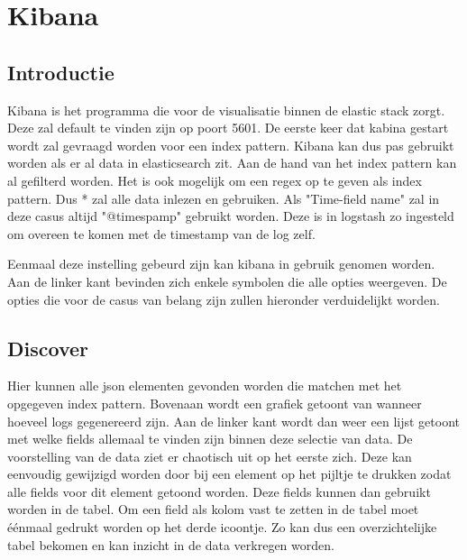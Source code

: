 
\chapter{Kibana}
\label{ch:kibana}

\section{Introductie}
\label{sec:introductie}
Kibana is het programma die voor de visualisatie binnen de elastic stack zorgt. Deze zal default te vinden zijn op poort 5601. 
De eerste keer dat kabina gestart wordt zal gevraagd worden voor een index pattern. Kibana kan dus pas gebruikt worden als er al data in elasticsearch zit.
Aan de hand van het index pattern kan al gefilterd worden. Het is ook mogelijk om een regex op te geven als index pattern. Dus * zal alle data inlezen en gebruiken. 
Als "Time-field name" zal in deze casus altijd "@timespamp" gebruikt worden. Deze is in logstash zo ingesteld om overeen te komen met de timestamp van de log zelf.

Eenmaal deze instelling gebeurd zijn kan kibana in gebruik genomen worden. Aan de linker kant bevinden zich enkele symbolen die alle opties weergeven. 
De opties die voor de casus van belang zijn zullen hieronder verduidelijkt worden.

\section{Discover}
\label{sec:discover}

Hier kunnen alle json elementen gevonden worden die matchen met het opgegeven index pattern. Bovenaan wordt een grafiek getoont van wanneer hoeveel logs gegenereerd zijn. 
Aan de linker kant wordt dan weer een lijst getoont met welke fields allemaal te vinden zijn binnen deze selectie van data. 
De voorstelling van de data ziet er chaotisch uit op het eerste zich. Deze kan eenvoudig gewijzigd worden door bij een element op het pijltje te drukken zodat alle fields voor dit element getoond worden.
Deze fields kunnen dan gebruikt worden in de tabel. Om een field als kolom vast te zetten in de tabel moet éénmaal gedrukt worden op het derde icoontje. 
Zo kan dus een overzichtelijke tabel bekomen en kan inzicht in de data verkregen worden.


